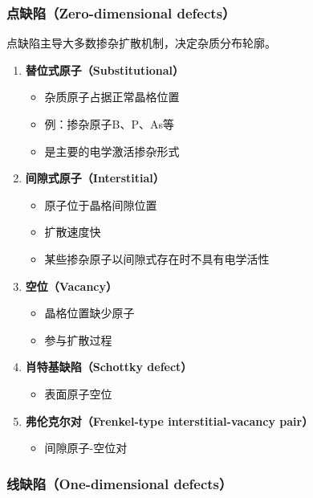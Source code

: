 \documentclass[UTF8,12pt,a4paper]{ctexart}
\begin{document}
\subsubsection{点缺陷（Zero-dimensional defects）}

点缺陷主导大多数掺杂扩散机制，决定杂质分布轮廓。

\begin{enumerate}
    \item \textbf{替位式原子（Substitutional）}
    \begin{itemize}
        \item 杂质原子占据正常晶格位置
        \item 例：掺杂原子B、P、As等
        \item 是主要的电学激活掺杂形式
    \end{itemize}
    
    \item \textbf{间隙式原子（Interstitial）}
    \begin{itemize}
        \item 原子位于晶格间隙位置
        \item 扩散速度快
        \item 某些掺杂原子以间隙式存在时不具有电学活性
    \end{itemize}
    
    \item \textbf{空位（Vacancy）}
    \begin{itemize}
        \item 晶格位置缺少原子
        \item 参与扩散过程
    \end{itemize}
    
    \item \textbf{肖特基缺陷（Schottky defect）}
    \begin{itemize}
        \item 表面原子空位
    \end{itemize}
    
    \item \textbf{弗伦克尔对（Frenkel-type interstitial-vacancy pair）}
    \begin{itemize}
        \item 间隙原子-空位对
    \end{itemize}
\end{enumerate}

\subsubsection{线缺陷（One-dimensional defects）}
\end{document}

